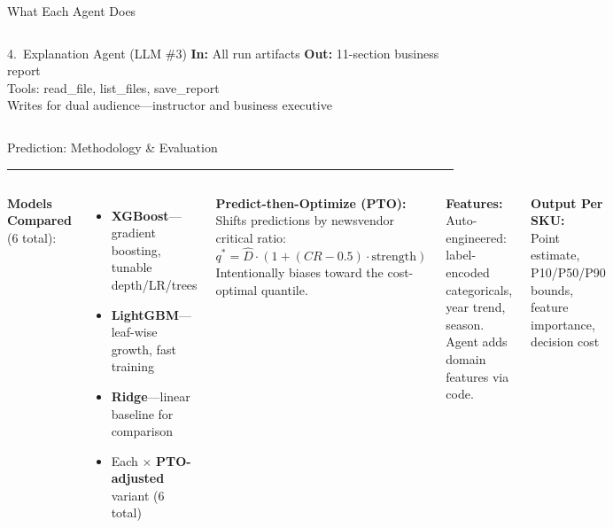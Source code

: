 \documentclass[aspectratio=169, 9pt]{beamer}
\newcommand{\goldrule}{\textcolor{PurdueGold}{\rule{\linewidth}{1.2pt}}}
\begin{document}
\begin{frame}{What Each Agent Does}
\begin{columns}[T]
\vspace{2pt}
\begin{block}{4.\ Explanation Agent {\tiny\color{CoolGray}(LLM \#3)}}
\scriptsize
\textbf{In:} All run artifacts \quad \textbf{Out:} 11-section business report\\
Tools: read\_file, list\_files, save\_report\\
Writes for dual audience---instructor and business executive
\end{block}
\end{columns}
\end{frame}

\begin{frame}{Prediction: Methodology \& Evaluation}
\goldrule
\vspace{2pt}
\begin{columns}[T]
{\small\textbf{\color{AgedGold}Models Compared} (6 total):}
\begin{itemize}\scriptsize
  \item \textbf{XGBoost}---gradient boosting, tunable depth/LR/trees
  \item \textbf{LightGBM}---leaf-wise growth, fast training
  \item \textbf{Ridge}---linear baseline for comparison
  \item Each $\times$ \textbf{PTO-adjusted} variant (6 total)
\end{itemize}

\vspace{3pt}
{\small\textbf{\color{AgedGold}Predict-then-Optimize (PTO):}}\\
{\scriptsize Shifts predictions by newsvendor critical ratio:\\
$q^* = \hat{D} \cdot (1 + (CR - 0.5) \cdot \text{strength})$\\
Intentionally biases toward the cost-optimal quantile.}

\vspace{3pt}
{\small\textbf{\color{AgedGold}Features:}}\\
{\scriptsize Auto-engineered: label-encoded categoricals, year trend, season. Agent adds domain features via code.}

\vspace{3pt}
{\small\textbf{\color{AgedGold}Output Per SKU:}}\\
{\scriptsize Point estimate, P10/P50/P90 bounds, feature importance, decision cost}


\end{columns}
\end{frame}
\end{document}
